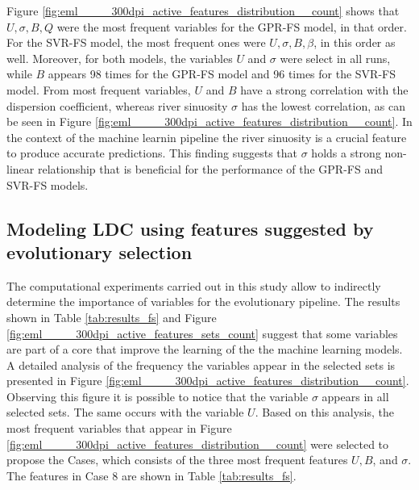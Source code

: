 \documentclass[a4paper,12pt, english]{article}
\begin{document}
Figure \ref{fig:eml____300dpi_active_features_distribution__count} shows that $ U, \sigma, B, Q $ were the most frequent variables for the GPR-FS model, in that order. For the SVR-FS model, the most frequent ones were $ U, \sigma, B, \beta $, in this order as well.
Moreover, for both models, the variables $ U $ and $ \sigma $ were select in all runs, while  $ B $  appears 98 times for the GPR-FS model and 96 times for the SVR-FS model.
From most frequent variables, $ U $ and $ B $ have a strong correlation with the dispersion coefficient, whereas river sinuosity $ \sigma $ has the lowest correlation, as can be seen in Figure \ref{fig:eml____300dpi_active_features_distribution__count}. 
In the context of the machine learnin pipeline the river sinuosity is a crucial feature to produce accurate predictions. This finding suggests that $\sigma$ holds a strong non-linear relationship that is beneficial for the performance of the GPR-FS and SVR-FS models.


\subsection{\label{sec:ldc-sfs} Modeling LDC using features suggested by evolutionary selection}

The computational experiments carried out in this study allow to indirectly determine the importance of variables for the evolutionary pipeline. 
The results shown in Table  \ref{tab:results_fs} and  Figure \ref{fig:eml____300dpi_active_features_sets_count} suggest that some variables are part of a core that improve the learning of the the machine learning models.
A detailed analysis of the frequency  the variables appear in the selected sets is presented in Figure \ref{fig:eml____300dpi_active_features_distribution__count}.
Observing this figure it is possible to notice that the variable $ \sigma $ appears in all selected sets. The same occurs with the variable $ U $. 
% 
Based on this analysis, the most frequent variables that appear in Figure \ref{fig:eml____300dpi_active_features_distribution__count} were selected to propose the Cases, 
which consists of the three most frequent features  $U, B$, and $\sigma$.
The features in Case 8 are shown in Table \ref{tab:results_fs}.
\end{document}

